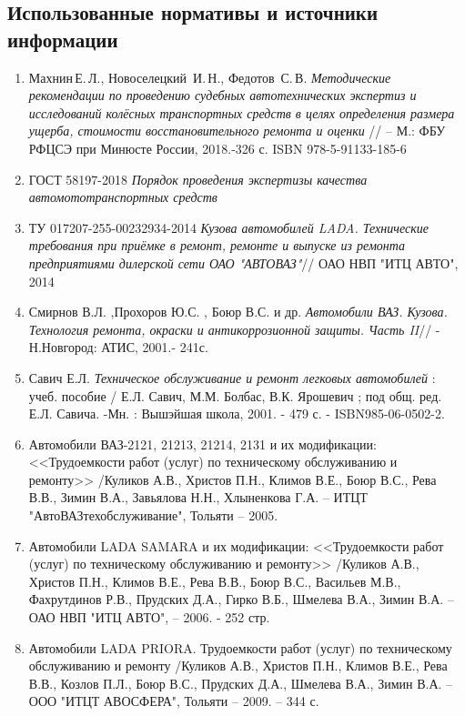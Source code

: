 
\subsection{Использованные нормативы и источники информации}
%
\begin{enumerate}
\item 
Махнин\,Е.\,Л., Новоселецкий\, И.\,Н., Федотов\, С.\,В. \emph{Методические рекомендации по проведению судебных автотехнических экспертиз и исследований колёсных транспортных средств в целях определения размера ущерба, стоимости восстановительного ремонта и оценки} // -- М.: ФБУ РФЦСЭ при Минюсте России, 2018.-326 с.  ISBN 978-5-91133-185-6
%
%
%
\item ГОСТ 58197-2018 \emph{Порядок проведения экспертизы качества автомототранспортных средств}
%
\item ТУ 017207-255-00232934-2014 \emph{Кузова автомобилей LADA. Технические требования при приёмке в ремонт, ремонте и выпуске из ремонта предприятиями дилерской сети ОАО "АВТОВАЗ"}//  ОАО НВП "ИТЦ АВТО", 2014
%
\item Смирнов  В.Л. ,Прохоров  Ю.С. , Боюр В.С.  и др. \emph{Автомобили ВАЗ. Кузова. Технология ремонта, окраски и  антикоррозионной защиты. Часть II}// - Н.Новгород: АТИС, 2001.- 241с.
%
\item 
Савич Е.Л. \emph{Техническое  обслуживание  и  ремонт  легковых  автомобилей} : учеб. пособие / Е.Л. Савич, М.М. Болбас, В.К. Ярошевич ; под общ. ред. Е.Л. Савича. -Мн. : Вышэйшая школа,  2001. - 479 с. - ISBN985-06-0502-2.
%
\item 
Автомобили ВАЗ-2121, 21213, 21214, 2131 и их модификации: <<Трудоемкости работ (услуг) по техническому обслуживанию и ремонту>> /Куликов А.В., Христов П.Н., Климов В.Е.,  Боюр В.С., Рева В.В., Зимин В.А., Завьялова Н.Н., Хлыненкова Г.А. -- ИТЦТ "АвтоВАЗтехобслуживание", Тольяти -- 2005. 
%
\item
Автомобили LADA SAMARA и их модификации: <<Трудоемкости работ (услуг) по техническому обслуживанию и ремонту>> /Куликов А.В., Христов П.Н., Климов В.Е., Рева В.В., Боюр В.С., Васильев М.В., Фахрутдинов Р.В.,  Прудских Д.А., Гирко В.Б., Шмелева В.А., Зимин В.А. --  ОАО НВП "ИТЦ АВТО",  -- 2006. - 252 стр.
%
\item 
Автомобили LADA PRIORA. Трудоемкости работ (услуг) по техническому обслуживанию и ремонту /Куликов А.В., Христов П.Н., Климов В.Е., Рева В.В., Козлов П.Л., Боюр В.С., Прудских Д.А., Шмелева В.А., Зимин В.А. -- ООО "ИТЦТ АВОСФЕРА", Тольяти -- 2009. -- 344 с.

\end{enumerate}
